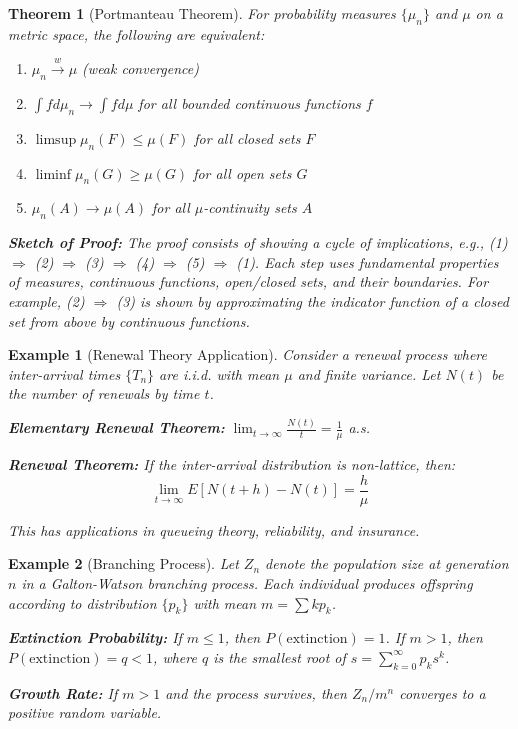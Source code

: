 \documentclass[12pt,a4paper]{article}
\newtheorem{theorem}{Theorem}[section]
\newtheorem{example}{Example}[section]
\theoremstyle{remark}
\begin{document}
\begin{theorem}[Portmanteau Theorem]
For probability measures $\{\mu_n\}$ and $\mu$ on a metric space, the following are equivalent:
\begin{enumerate}
\item $\mu_n \stackrel{w}{\to} \mu$ (weak convergence)
\item $\int f d\mu_n \to \int f d\mu$ for all bounded continuous functions $f$
\item $\limsup \mu_n(F) \leq \mu(F)$ for all closed sets $F$
\item $\liminf \mu_n(G) \geq \mu(G)$ for all open sets $G$
\item $\mu_n(A) \to \mu(A)$ for all $\mu$-continuity sets $A$
\end{enumerate}

\textbf{Sketch of Proof:} The proof consists of showing a cycle of implications, e.g., (1) $\Rightarrow$ (2) $\Rightarrow$ (3) $\Rightarrow$ (4) $\Rightarrow$ (5) $\Rightarrow$ (1). Each step uses fundamental properties of measures, continuous functions, open/closed sets, and their boundaries. For example, (2) $\Rightarrow$ (3) is shown by approximating the indicator function of a closed set from above by continuous functions.
\end{theorem}

\begin{example}[Renewal Theory Application]
Consider a renewal process where inter-arrival times $\{T_n\}$ are i.i.d. with mean $\mu$ and finite variance. Let $N(t)$ be the number of renewals by time $t$.

\textbf{Elementary Renewal Theorem:} $\lim_{t \to \infty} \frac{N(t)}{t} = \frac{1}{\mu}$ a.s.

\textbf{Renewal Theorem:} If the inter-arrival distribution is non-lattice, then:
$$\lim_{t \to \infty} E[N(t+h) - N(t)] = \frac{h}{\mu}$$

This has applications in queueing theory, reliability, and insurance.
\end{example}

\begin{example}[Branching Process]
Let $Z_n$ denote the population size at generation $n$ in a Galton-Watson branching process. Each individual produces offspring according to distribution $\{p_k\}$ with mean $m = \sum k p_k$.

\textbf{Extinction Probability:} If $m \leq 1$, then $P(\text{extinction}) = 1$. If $m > 1$, then $P(\text{extinction}) = q < 1$, where $q$ is the smallest root of $s = \sum_{k=0}^{\infty} p_k s^k$.

\textbf{Growth Rate:} If $m > 1$ and the process survives, then $Z_n/m^n$ converges to a positive random variable.
\end{example}
\end{document}
